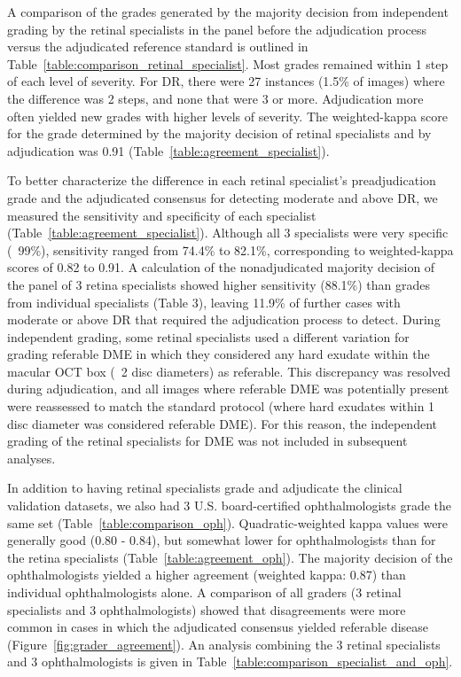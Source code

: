 \documentclass{llncs}
\begin{document}
A comparison of the grades generated by the majority decision from independent grading by the retinal specialists in the panel before the adjudication process versus the adjudicated reference standard is outlined in Table~\ref{table:comparison_retinal_specialist}. Most grades remained within 1 step of each level of severity. For DR, there were 27 instances (1.5\% of images) where the difference was 2 steps, and none that were 3 or more. Adjudication more often yielded new grades with higher levels of severity. The weighted-kappa score for the grade determined by the majority decision of retinal specialists and by adjudication was 0.91 (Table~\ref{table:agreement_specialist}).


To better characterize the difference in each retinal specialist's preadjudication grade and the adjudicated consensus for detecting moderate and above DR, we measured the sensitivity and specificity of each specialist (Table~\ref{table:agreement_specialist}). Although all 3 specialists were very specific (~99\%), sensitivity ranged from 74.4\% to 82.1\%, corresponding to weighted-kappa scores of 0.82 to 0.91. A calculation of the nonadjudicated majority decision of the panel of 3 retina specialists showed higher sensitivity (88.1\%) than grades from individual specialists (Table 3), leaving 11.9\% of further cases with moderate or above DR that required the adjudication process to detect. During independent grading, some retinal specialists used a different variation for grading referable DME in which they considered any hard exudate within the macular OCT box (~2 disc diameters) as referable. This discrepancy was resolved during adjudication, and all images where referable DME was potentially present were reassessed to match the standard protocol (where hard exudates within 1 disc diameter was considered referable DME). For this reason, the independent grading of the retinal specialists for DME was not included in subsequent analyses.

In addition to having retinal specialists grade and adjudicate the clinical validation datasets, we also had 3 U.S. board-certified ophthalmologists grade the same set (Table~\ref{table:comparison_oph}). Quadratic-weighted kappa values were generally good (0.80 - 0.84), but somewhat lower for ophthalmologists than for the retina specialists (Table~\ref{table:agreement_oph}). The majority decision of the ophthalmologists yielded a higher agreement (weighted kappa: 0.87) than individual ophthalmologists alone. A comparison of all graders (3 retinal specialists and 3 ophthalmologists) showed that disagreements were more common in cases in which the adjudicated consensus yielded referable disease (Figure~\ref{fig:grader_agreement}). An analysis combining the 3 retinal specialists and 3 ophthalmologists is given in Table~\ref{table:comparison_specialist_and_oph}.
\end{document}
